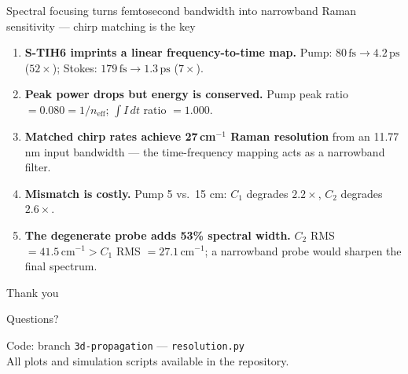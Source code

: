 \documentclass[aspectratio=169, 11pt]{beamer}
\newcommand{\wn}{\,\text{cm}^{-1}}
\newcommand{\neff}{n_{\mathrm{eff}}}
\begin{document}
\begin{frame}{Spectral focusing turns femtosecond bandwidth into narrowband Raman sensitivity — chirp matching is the key}
  \begin{enumerate}
    \setlength{\itemsep}{0.60em}
    \item \textbf{S-TIH6 imprints a linear frequency-to-time map.}
          Pump: $80\,\text{fs} \to 4.2\,\text{ps}$ ($52\times$); Stokes: $179\,\text{fs} \to 1.3\,\text{ps}$ ($7\times$).
    \item \textbf{Peak power drops but energy is conserved.}
          Pump peak ratio $= 0.080 = 1/\neff$; \;$\int I\,dt$ ratio $= 1.000$.
    \item \textbf{Matched chirp rates achieve 27\,cm$^{-1}$ Raman resolution}
          from an 11.77 nm input bandwidth — the time-frequency mapping acts as a narrowband filter.
    \item \textbf{Mismatch is costly.}
          Pump 5 vs.\ 15 cm: $C_1$ degrades $2.2\times$, $C_2$ degrades $2.6\times$.
    \item \textbf{The degenerate probe adds 53\% spectral width.}
          $C_2$ RMS $=41.5\wn > C_1$ RMS $=27.1\wn$; a narrowband probe would sharpen the final spectrum.
  \end{enumerate}
\end{frame}

\begin{frame}[standout]
  \Huge Thank you

  \vspace{0.7em}
  \large Questions?

  \vspace{1.2em}
  \normalsize
  Code: branch \texttt{3d-propagation} \;—\; \texttt{resolution.py}\\[0.4em]
  All plots and simulation scripts available in the repository.
\end{frame}

\end{document}
